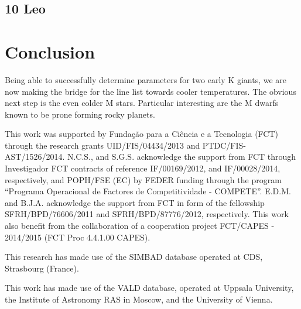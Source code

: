 \documentclass{aa}
\begin{document}
\subsection{10 Leo}
\label{sec:10Leo}







\section{Conclusion}
\label{sec:conclusion}

Being able to successfully determine parameters for two early K giants, we are
now making the bridge for the line list towards cooler temperatures. The obvious
next step is the even colder M stars. Particular interesting are the M dwarfs
known to be prone forming rocky planets.





\begin{acknowledgements}

This work was supported by Funda\c{c}\~ao para a Ci\^encia e a
Tecnologia (FCT) through the research grants UID/FIS/04434/2013 and
PTDC/FIS-AST/1526/2014. N.C.S., and S.G.S. acknowledge the support from
FCT through Investigador FCT contracts of reference IF/00169/2012, and
IF/00028/2014, respectively, and POPH/FSE (EC) by FEDER funding through
the program “Programa Operacional de Factores de Competitividade
- COMPETE”. E.D.M. and B.J.A. acknowledge the support from FCT in
form of the fellowship SFRH/BPD/76606/2011 and SFRH/BPD/87776/2012,
respectively. This work also benefit from the collaboration of a
cooperation project FCT/CAPES - 2014/2015 (FCT Proc 4.4.1.00 CAPES).

This research has made use of the SIMBAD database operated at CDS,
Strasbourg (France).

This work has made use of the VALD database, operated at Uppsala
University, the Institute of Astronomy RAS in Moscow, and the University
of Vienna.

\end{acknowledgements}




\end{document}

